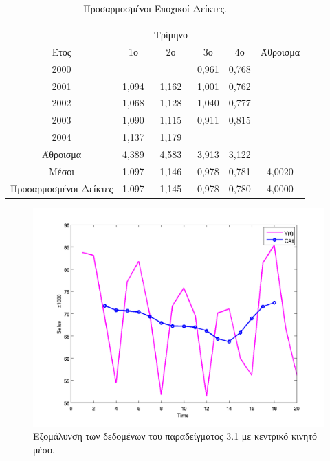 \begin{table} [h]
\begin{center}
\begin{tabular}{|c|c|c|c|c|c|c|c|}
      \hline
    \end{tabular}
  \end{center}
\end{table}

\begin{table} [h]
  \caption{Προσαρμοσμένοι Εποχικοί Δείκτες.} 
  \label{tab_2}
  \begin{center}
    \begin{tabular}{|c|c c c c|c|}
      \hline
      &  &  &  &  &\\
      &  &  Τρίμηνο &  &  & \\
   Έτος   & 1ο & 2ο & 3ο  & 4ο  & Άθροισμα \\
   \hline \hline
   2000&   &  & 0,961 &0,768  &  \\
   2001  &1,094  & 1,162 & 1,001 &0,762 &  \\
   2002& 1,068 & 1,128 & 1,040 & 0,777 &  \\
    2003& 1,090 & 1,115 & 0,911 & 0,815 &  \\  
    2004& 1,137 & 1,179 &  &  &  \\
    \hline
    Άθροισμα & 4,389 & 4,583 &3,913  & 3,122 &  \\
    Μέσοι& 1,097 & 1,146 & 0,978 & 0,781 & 4,0020 \\
    Προσαρμοσμένοι Δείκτες& 1,097 &1,145 & 0,978 & 0,780 & 4,0000 \\
      \hline
    \end{tabular}
  \end{center}
\end{table}

\begin{figure} [ht]
  \centering
  \includegraphics[totalheight=4in,angle=0]{graff2.png}
  \caption{Εξομάλυνση των δεδομένων του παραδείγματος 3.1 με κεντρικό κινητό μέσο.}
\end{figure}
 

